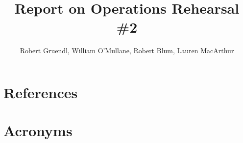 \documentclass[DM,authoryear,toc]{lsstdoc}
\title{Report on Operations Rehearsal \#2}
\author{%
Robert Gruendl, William O'Mullane, Robert Blum, Lauren MacArthur
}
\date{\vcsDate}
\begin{document}
\mkshorttitle %




\appendix
\section{References} \label{sec:bib}
\renewcommand{\refname}{} %


\section{Acronyms} \label{sec:acronyms}

\end{document}
